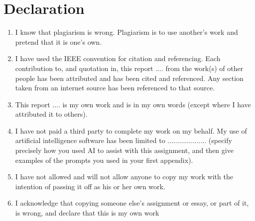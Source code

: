 {
\onehalfspacing
   
\chapter*{Declaration}

\vskip 10mm
\begin{enumerate}
    \item I know that plagiarism is wrong.
    Plagiarism is to use another’s work and pretend that it is one’s own.
    \item I have used the IEEE convention for citation and referencing.
    Each contribution to, and quotation in, this report .... from the work(s) of other people has been attributed and has been cited and referenced.
    Any section taken from an internet source has been referenced to that source.
    \item This report .... is my own work and is in my own words (except where I have attributed it to others).
    \item I have not paid a third party to complete my work on my behalf.
    My use of artificial intelligence software has been limited to .................... (specify precisely how you used AI to assist with this assignment, and then give examples of the prompts you used in your first appendix).
    \item I have not allowed and will not allow anyone to copy my work with the intention of passing it off as his or her own work.
    \item I acknowledge that copying someone else’s assignment or essay, or part of it, is wrong, and declare that this is my own work
\end{enumerate}
\vskip 30mm

\par\noindent{}\hfill\makebox[2.0in]{\today}%
\par\noindent\makebox[2.5in]{\hrulefill} \hfill\makebox[2.0in]{\hrulefill}%
\par\noindent{}      \hfill{}%

}